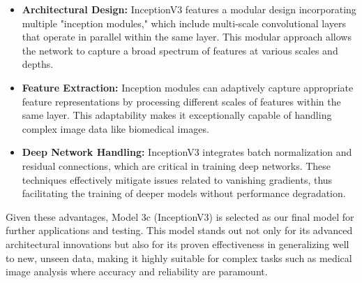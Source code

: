 \begin{itemize}
    \item \textbf{Architectural Design:} InceptionV3 features a modular design incorporating multiple "inception modules," which include multi-scale convolutional layers that operate in parallel within the same layer. This modular approach allows the network to capture a broad spectrum of features at various scales and depths.
    \item \textbf{Feature Extraction:} Inception modules can adaptively capture appropriate feature representations by processing different scales of features within the same layer. This adaptability makes it exceptionally capable of handling complex image data like biomedical images.
    \item \textbf{Deep Network Handling:} InceptionV3 integrates batch normalization and residual connections, which are critical in training deep networks. These techniques effectively mitigate issues related to vanishing gradients, thus facilitating the training of deeper models without performance degradation.
\end{itemize}

Given these advantages, Model 3c (InceptionV3) is selected as our final model for further applications and testing. This model stands out not only for its advanced architectural innovations but also for its proven effectiveness in generalizing well to new, unseen data, making it highly suitable for complex tasks such as medical image analysis where accuracy and reliability are paramount.


